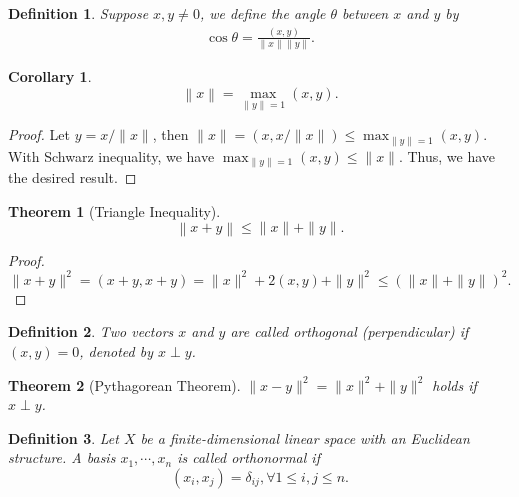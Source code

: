 \documentclass[10pt]{book}
\newtheorem{definition}{Definition}[chapter]
\newtheorem{theorem}{Theorem}[chapter]
\newtheorem{corollary}{Corollary}[theorem]
\theoremstyle{definition}
\numberwithin{equation}{chapter}
\begin{document}
\medskip

\begin{definition}
Suppose $x,y\neq 0$, we define the angle $\theta$ between $x$ and $y$ by
\begin{align*}
    \cos \theta = \frac{(x,y)}{\|x\| \|y\|}.
\end{align*}
\end{definition}

\medskip

\begin{corollary}
$$\left\|x\right\| = \max_{\|y\| = 1} (x,y).$$
\end{corollary}
\begin{proof}
Let $y = x/\|x\|$, then $\|x\| = \left(x, x/\|x\|\right) \leq \max_{\|y\| = 1} (x,y)$. With Schwarz inequality, we have $\max_{\|y\| = 1} (x,y) \leq \|x\|$. Thus, we have the desired result.
\end{proof}

\medskip

\begin{theorem}[Triangle Inequality]
$$\left\|x + y\right\|\leq \|x\| + \|y\|.$$
\end{theorem}
\begin{proof}
$$\|x+y\|^2 = (x+y, x+y) = \|x\|^2 + 2(x,y) + \|y\|^2 \leq (\|x\| + \|y\|)^2.$$
\end{proof}

\medskip

\begin{definition}
Two vectors $x$ and $y$ are called orthogonal (perpendicular) if $(x,y) = 0$, denoted by $x \perp y$.
\end{definition}

\medskip

\begin{theorem}[Pythagorean Theorem]
$\|x-y\|^2 = \|x\|^2 + \|y\|^2$ holds if $x \perp y$.
\end{theorem}

\medskip

\begin{definition}
Let $X$ be a finite-dimensional linear space with an Euclidean structure. A basis $x_1, \cdots, x_n$ is called orthonormal if 
$$(x_i, x_j) = \delta_{ij}, \forall 1\leq i,j\leq n.$$
\end{definition}

\medskip
\end{document}
